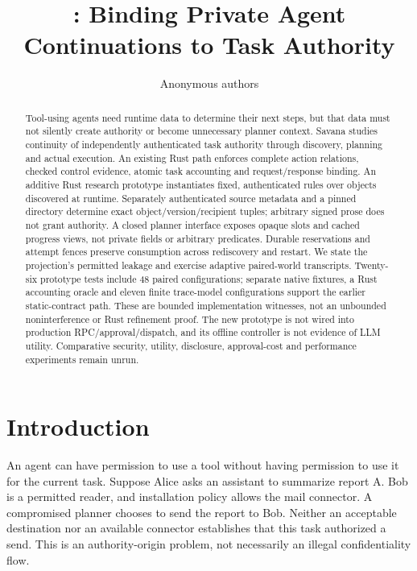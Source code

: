 \documentclass[letterpaper,twocolumn,10pt]{article}
\date{}
\title{\Large\bf \sys{}: Binding Private Agent Continuations to Task Authority}
\author{Anonymous authors}
\newcommand{\sys}{Savana}
\begin{document}
\maketitle
\thispagestyle{empty}

\begin{abstract}
Tool-using agents need runtime data to determine their next steps, but that data
must not silently create authority or become unnecessary planner context.
\sys{} studies continuity of independently authenticated task authority through
discovery, planning and actual execution. An existing Rust path enforces complete
action relations, checked control evidence, atomic task accounting and
request/response binding. An additive Rust research prototype instantiates
fixed, authenticated rules over objects discovered at runtime. Separately
authenticated source metadata and a pinned directory determine exact
object/version/recipient tuples; arbitrary signed prose does not grant authority.
A closed planner interface exposes opaque slots and cached progress views,
not private fields or arbitrary predicates. Durable reservations and attempt
fences preserve consumption across rediscovery and restart. We state the
projection's permitted leakage and exercise adaptive paired-world transcripts.
Twenty-six prototype tests include 48 paired configurations; separate native
fixtures, a Rust accounting oracle and eleven finite trace-model configurations
support the earlier static-contract path. These are bounded implementation
witnesses, not an unbounded noninterference or Rust refinement proof. The new
prototype is not wired into production RPC/approval/dispatch, and its offline
controller is not evidence of LLM utility. Comparative security, utility,
disclosure, approval-cost and performance experiments remain unrun.
\end{abstract}

\section{Introduction}
\label{sec:intro}

An agent can have permission to use a tool without having permission to use it
for the current task. Suppose Alice asks an assistant to summarize report A.
Bob is a permitted reader, and installation policy allows the mail connector.
A compromised planner chooses to send the report to Bob. Neither an acceptable
destination nor an available connector establishes that this task authorized
a send. This is an authority-origin problem, not necessarily an illegal
confidentiality flow.
\end{document}
